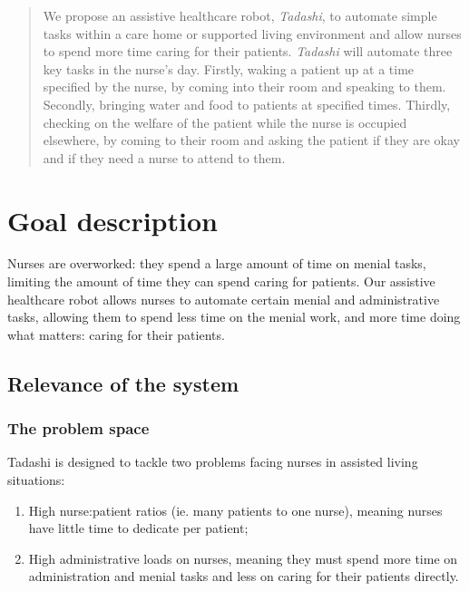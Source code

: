 \documentclass{article}
\begin{document}
 




\begin{abstract}
  We propose an assistive healthcare robot, {\it Tadashi}, to automate simple tasks within a care home or supported living environment and allow nurses to spend more time caring for their patients.
  {\it Tadashi} will automate three key tasks in the nurse's day. Firstly, waking a patient up at a time specified by the nurse, by coming into their room and speaking to them. Secondly, bringing water and food to patients at specified times. Thirdly, checking on the welfare of the patient while the nurse is occupied elsewhere, by coming to their room and asking the patient if they are okay and if they need a nurse to attend to them. 
\end{abstract} 

\section{Goal description}
Nurses are overworked: they spend a large amount of time on menial tasks, limiting the amount of time they can spend caring for patients. Our assistive healthcare robot allows nurses to automate certain menial and administrative tasks, allowing them to spend less time on the menial work, and more time doing what matters: caring for their patients. 

\subsection{Relevance of the system}
\subsubsection{The problem space}
Tadashi is designed to tackle two problems facing nurses in assisted living situations:
\begin{enumerate}
\item High nurse:patient ratios (ie. many patients to one nurse), meaning nurses have little time to dedicate per patient;
\item High administrative loads on nurses, meaning they must spend more time on administration and menial tasks and less on caring for their patients directly.
\end{enumerate}
\end{document}
